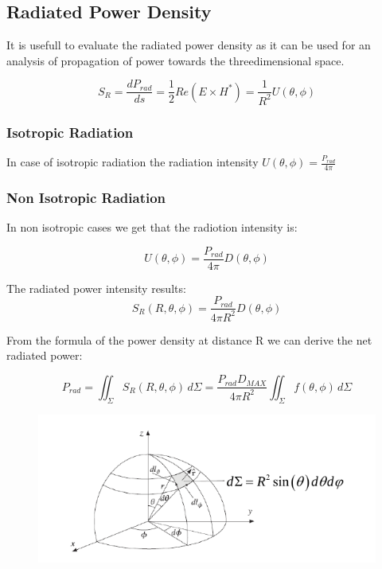 \subsection{Radiated Power Density} %
\label{sub:radiated_power_density}

It is usefull to evaluate the radiated power density as it can be used for an analysis of propagation of power towards the threedimensional space.

\begin{equation}
	S_R=\frac{dP_{rad}}{ds}=\frac{1}{2}Re(E\times H^*)=\frac{1}{R^2}\textit{U}(\theta,\phi)
\end{equation}

\subsubsection*{Isotropic Radiation}

In case of isotropic radiation the radiation intensity $\textit{U}(\theta,\phi)= \frac{P_{rad}}{4\pi}$ 

\subsubsection*{Non Isotropic Radiation}

In non isotropic cases we get that the radiotion intensity is:

\begin{equation}
\textit{U}(\theta,\phi)= \frac{P_{rad}}{4\pi} \textit{D}(\theta, \phi)
\end{equation}


The radiated power intensity results:
\begin{equation}
S_R(R,\theta,\phi)= \frac{P_{rad}}{4\pi R^2} \textit{D}(\theta, \phi)
\end{equation}

From the formula of the power density at distance R we can derive the net radiated power:

\begin{equation}
	P_{rad}= \iint_{\Sigma} S_R(R, \theta, \phi)\, d\Sigma = \frac{P_{rad}D_{MAX}}{4 \pi R^2}\iint_{\Sigma} f(\theta, \phi) \, d\Sigma
\end{equation}


\begin{figure}[h]
	\centering
	\includegraphics[scale=0.6]{Immagini/sph}	
	\label{fig:sph}
\end{figure}

